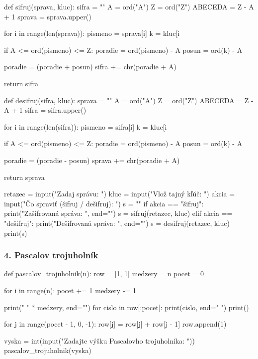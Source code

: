\begin{solution}
def sifruj(sprava, kluc):
    sifra = ""
    A = ord("A")
    Z = ord("Z")
    ABECEDA = Z - A + 1
    sprava = sprava.upper()

    for i in range(len(sprava)):
        pismeno = sprava[i]
        k = kluc[i %

        if A <= ord(pismeno) <= Z:
            poradie = ord(pismeno) - A
            posun = ord(k) - A

            poradie = (poradie + posun) %
            sifra += chr(poradie + A)

    return sifra

def desifruj(sifra, kluc):
    sprava = ""
    A = ord("A")
    Z = ord("Z")
    ABECEDA = Z - A + 1
    sifra = sifra.upper()

    for i in range(len(sifra)):
        pismeno = sifra[i]
        k = kluc[i %

        if A <= ord(pismeno) <= Z:
            poradie = ord(pismeno) - A
            posun = ord(k) - A

            poradie = (poradie - posun) %
            sprava += chr(poradie + A)

    return sprava

retazec = input("Zadaj správu: ")
kluc = input("Vlož tajný kľúč: ")
akcia = input("Čo spraviť (šifruj / dešifruj): ")
s = ""
if akcia == "šifruj":
    print("Zašifrovaná správa: ", end="")
    s = sifruj(retazec, kluc)
elif akcia == "dešifruj":
    print("Dešifrovaná správa: ", end="")
    s = desifruj(retazec, kluc)
print(s)
\end{solution}

\subsubsection*{4. Pascalov trojuholník}
\begin{solution}
def pascalov_trojuholnik(n):
    row = [1, 1]
    medzery = n
    pocet = 0

    for i in range(n):
        pocet += 1
        medzery -= 1

        print(" " * medzery, end="")
        for cislo in row[:pocet]:
            print(cislo, end=" ")
        print()

        for j in range(pocet - 1,  0, -1):
            row[j] = row[j] + row[j - 1]
        row.append(1)

vyska = int(input("Zadajte výšku Pascalovho trojuholníka: "))
pascalov_trojuholnik(vyska)
\end{solution}

